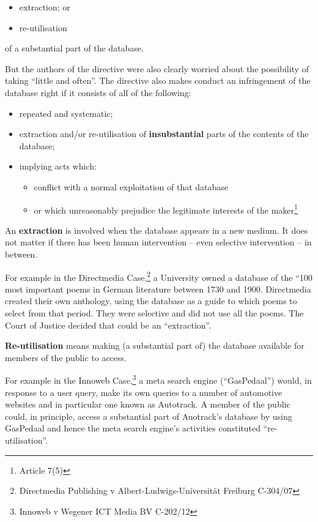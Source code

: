 \begin{itemize}
\item
  extraction; or
\item
  re-utilisation
\end{itemize}

of a substantial part of the database.

But the authors of the directive were also clearly worried about the
possibility of taking ``little and often''. The directive also makes
conduct an infringement of the database right if it consists of all of
the following:

\begin{itemize}
\item
  repeated and systematic;
\item
  extraction and/or re-­utilisation of \textbf{insubstantial} parts of
  the contents of the database;
\item
  implying acts which:

  \begin{itemize}
  \itemsep1pt\parskip0pt
  \item
    conflict with a normal exploitation of that database
  \item
    or which unreasonably prejudice the legitimate interests of the
    maker\footnote{Article 7(5)}
  \end{itemize}
\end{itemize}

An \textbf{extraction} is involved when the database appears in a new
medium. It does not matter if there has been human intervention -- even
selective intervention -- in between.

For example in the Directmedia Case,\footnote{Directmedia Publishing v
  Albert-Ludwigs-Universität Freiburg C-304/07} a University owned a
database of the ``100 most important poems in German literature between
1730 and 1900. Directmedia created their own anthology, using the
database as a guide to which poems to select from that period. They were
selective and did not use all the poems. The Court of Justice decided
that could be an ``extraction''.

\textbf{Re-utilisation} means making (a substantial part of) the
database available for members of the public to access.

For example in the Innoweb Case,\footnote{Innoweb v Wegener ICT Media BV
  C-202/12} a meta search engine (``GasPedaal'') would, in response to a
user query, make its own queries to a number of automotive websites and
in particular one known as Autotrack. A member of the public could, in
principle, access a substantial part of Auotrack's database by using
GasPedaal and hence the meta search engine's activities constituted
``re-utilisation''.

